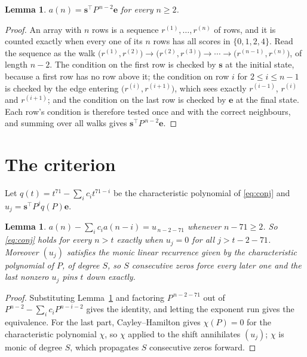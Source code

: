 \documentclass[11pt,a4paper]{article}
\theoremstyle{plain}
\newtheorem{lemma}[theorem]{Lemma}
\theoremstyle{definition}
\begin{document}
\begin{lemma}\label{lem:walk}
$a(n)=\mathbf{s}^{\!\top}P^{\,n-2}\mathbf{e}$ for every $n\ge2$.
\end{lemma}

\begin{proof}
An array with $n$ rows is a sequence $r^{(1)},\dots,r^{(n)}$ of rows, and it is counted
exactly when every one of its $n$ rows has all scores in $\{0,1,2,4\}$. Read the sequence as the
walk $\bigl(r^{(1)},r^{(2)}\bigr)\to\bigl(r^{(2)},r^{(3)}\bigr)\to\cdots\to
\bigl(r^{(n-1)},r^{(n)}\bigr)$, of length $n-2$. The condition on the first row is
checked by $\mathbf{s}$ at the initial state, because a first row has no row above it; the
condition on row $i$ for $2\le i\le n-1$ is checked by the edge entering
$\bigl(r^{(i)},r^{(i+1)}\bigr)$, which sees exactly $r^{(i-1)}$, $r^{(i)}$ and
$r^{(i+1)}$; and the condition on the last row is checked by $\mathbf{e}$ at the final
state. Each row's condition is therefore tested once and with the correct neighbours, and
summing over all walks gives $\mathbf{s}^{\!\top}P^{\,n-2}\mathbf{e}$.
\end{proof}

\section{The criterion}

Let $q(t)=t^{71}-\sum_i c_i t^{71-i}$ be the characteristic polynomial of
\eqref{eq:conj} and $u_j=\mathbf{s}^{\!\top}P^{j}q(P)\mathbf{e}$.

\begin{lemma}\label{lem:crit}
$a(n)-\sum_i c_i a(n-i)=u_{\,n-2-71}$ whenever $n-71\ge2$. So \eqref{eq:conj}
holds for every $n>t$ exactly when $u_j=0$ for all $j>t-2-71$. Moreover $(u_j)$
satisfies the monic linear recurrence given by the characteristic polynomial of $P$, of
degree $S$, so $S$ consecutive zeros force every later one and the last nonzero $u_j$ pins
$t$ down exactly.
\end{lemma}

\begin{proof}
Substituting Lemma~\ref{lem:walk} and factoring $P^{\,n-2-71}$ out of
$P^{n-2}-\sum_i c_i P^{n-i-2}$ gives the identity, and letting the exponent run gives the
equivalence. For the last part, Cayley--Hamilton gives $\chi(P)=0$ for the characteristic
polynomial $\chi$, so $\chi$ applied to the shift annihilates $(u_j)$; $\chi$ is monic of
degree $S$, which propagates $S$ consecutive zeros forward.
\end{proof}
\end{document}
